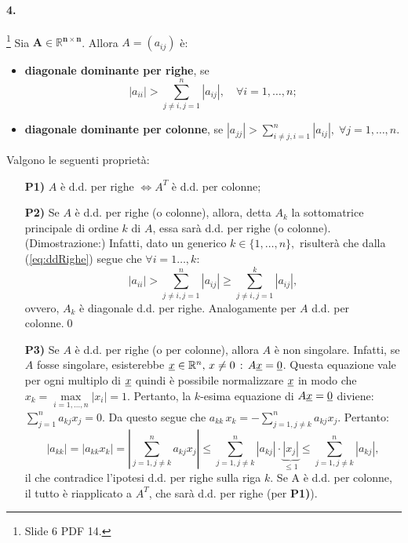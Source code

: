 \paragraph{4.}\footnote{Slide 6 PDF 14.} Sia $\boldsymbol{A\in\mathbb R^{n\times n}}$. Allora $A=(a_{ij})$ è:
\begin{itemize}
    \item \textbf{diagonale dominante per righe}, se
    \begin{equation}\label{eq:ddRighe}
        |a_{ii}|>\sum_{j\neq i, j=1}^n|a_{ij}|,\quad\forall i=1,\hdots,n;
    \end{equation}
    \item \textbf{diagonale dominante per colonne}, se $|a_{jj}|>\sum_{i\neq j, i=1}^n |a_{ij}|,\;\forall j=1,\hdots,n.$
\end{itemize}
Valgono le seguenti proprietà:
\begin{itemize}
    \item[\textbf{P1)}] $A$ è d.d. per righe $\iff A^T$ è d.d. per colonne;
    \item[\textbf{P2)}] Se $A$ è d.d. per righe (o colonne), allora, detta $A_k$ la sottomatrice principale di ordine $k$ di $A$, essa sarà d.d. per righe (o colonne). (Dimostrazione:) Infatti, dato un generico $k\in\{1,\hdots,n\},$ risulterà che dalla (\ref{eq:ddRighe}) segue che $\forall i=1\hdots,k:$
    \begin{equation*}
         |a_{ii}|>\sum_{j\neq i, j=1}^n|a_{ij}|\geq \sum_{j\neq i, j=1}^k|a_{ij}|,
    \end{equation*}
    ovvero, $A_k$ è diagonale d.d. per righe. Analogamente per $A$ d.d. per colonne.\qed
    \item[\textbf{P3)}] Se $A$ è d.d. per righe (o per colonne), allora $A$ è non singolare. Infatti, se $A$ fosse singolare, esisterebbe $\uline{x}\in\mathbb R^n,\, x\neq 0\,:\, A\uline{x}=\uline 0$. Questa equazione vale per ogni multiplo di $\uline x$ quindi è possibile normalizzare $\uline x$ in modo che $x_k=\underset{i=1,\hdots,n}{\max}|x_i|=1$. Pertanto, la $k$-esima equazione di $A\uline x=\uline 0$ diviene: $\sum_{j=1}^na_{kj}x_j=0.$ Da questo segue che $a_{kk}\,x_k=-\sum_{j=1,j\neq k}^n a_{kj}x_j.$ Pertanto:
    \begin{equation*}
        |a_{kk}|=|a_{kk}x_k|=\left|\sum_{j=1,j\neq k}^n a_{kj}x_j\right|\leq\sum_{j=1,j\neq k}^n |a_{kj}|\cdot\underbrace{|x_j|}_{\leq 1}\leq\sum_{j=1,j\neq k}^n |a_{kj}|,
    \end{equation*}
    il che contradice l'ipotesi d.d. per righe sulla riga $k$. Se A è d.d. per colonne, il tutto è riapplicato a $A^T$, che sarà d.d. per righe (per \textbf{P1)}).
\end{itemize}

